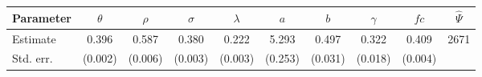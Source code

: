 
    \begin{tabular}{l*{9}{c}} \\ 
            \hline 
        Parameter & $\theta$ & $\rho$ & $\sigma$ & $\lambda$ & $a$ & $b$ & $\gamma$ & $fc$ & $\hat{\Psi}$ \\ 
        \hline 
        Estimate & 0.396 & 0.587 & 0.380 & 0.222 & 5.293 & 0.497 & 0.322 & 0.409 &  2671 \\ 
        Std. err. & (0.002) & (0.006) & (0.003) & (0.003) & (0.253) & (0.031) & (0.018) & (0.004) & \\ 
        \hline 
    \end{tabular} 
